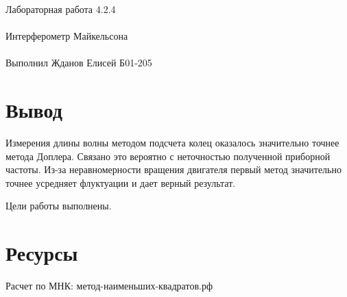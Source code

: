 \documentclass{astroedu-lab}
\begin{document}
\begin{problem}{\huge Лабораторная работа 4.2.4\\\\Интерферометр Майкельсона\\\\Выполнил Жданов Елисей Б01-205}

%
%
%
%
%



\section{Вывод}

Измерения длины волны методом подсчета колец оказалось значительно точнее метода Доплера. Связано это вероятно с неточностью полученной приборной частоты. Из-за неравномерности вращения двигателя первый метод значительно точнее усредняет флуктуации и дает верный результат.

Цели работы выполнены.

\section{Ресурсы}

Расчет по МНК: метод-наименьших-квадратов.рф


\end{problem}
\end{document}

